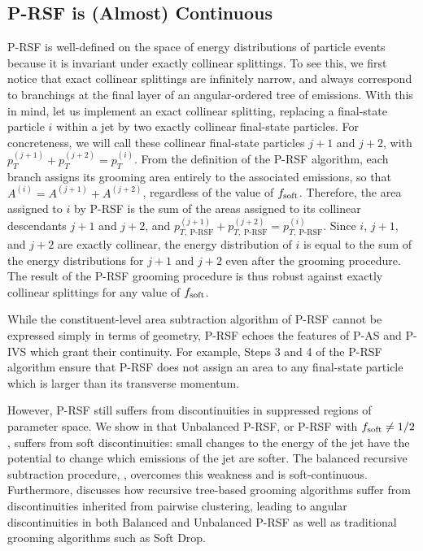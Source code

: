 \documentclass[letterpaper,11pt]{article}
\begin{document}
\subsection{P-RSF is (Almost) Continuous}
P-RSF is well-defined on the space of energy distributions of particle events because it is invariant under exactly collinear splittings.
%
To see this, we first notice that exact collinear splittings are infinitely narrow, and always correspond to branchings at the final layer of an angular-ordered tree of emissions.
%
With this in mind, let us implement an exact collinear splitting, replacing a final-state particle \(i\) within a jet by two exactly collinear final-state particles.
%
For concreteness, we will call these collinear final-state particles \(j+1\) and \(j+2\), with \(p_T^{(j+1)} + p_T^{(j+2)} = p_T^{(i)}\).
%
From the definition of the P-RSF algorithm, each branch assigns its grooming area entirely to the associated emissions, so that \(A^{(i)} = A^{(j+1)} + A^{(j+2)}\), regardless of the value of \(f_{\rm soft}\).
%
Therefore, the area assigned to \(i\) by P-RSF is the sum of the areas assigned to its collinear descendants \(j+1\) and \(j+2\), and \(p^{(j+1)}_{T,~{\text{P-RSF}}} + p^{(j+2)}_{T,~{\text{P-RSF}}} = p^{(i)}_{T,~{\text{P-RSF}}}\).
%
Since \(i\), \(j+1\), and \(j+2\) are exactly collinear, the energy distribution of \(i\) is equal to the sum of the energy distributions for \(j+1\) and \(j+2\) even after the grooming procedure.
%
The result of the P-RSF grooming procedure is thus robust against exactly collinear splittings for any value of \(f_{\rm soft}\).

While the constituent-level area subtraction algorithm of P-RSF cannot be expressed simply in terms of geometry, P-RSF echoes the features of P-AS and P-IVS which grant their continuity.
%
For example, Steps 3 and 4
of the P-RSF algorithm ensure that P-RSF does not assign an area to any final-state particle which is larger than its transverse momentum.

However, P-RSF still suffers from discontinuities in suppressed regions of parameter space.
%
We show in  that Unbalanced P-RSF, or P-RSF with \(f_{\rm soft} \neq 1/2\), suffers from soft discontinuities:
%
small changes to the energy of the jet have the potential to change which emissions of the jet are softer.
%
The balanced recursive subtraction procedure, , overcomes this weakness and is soft-continuous.
%
Furthermore,  discusses how recursive tree-based grooming algorithms suffer from discontinuities inherited from pairwise clustering, leading to angular discontinuities in both Balanced and Unbalanced P-RSF as well as traditional grooming algorithms such as Soft Drop.
\end{document}
